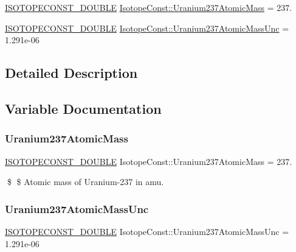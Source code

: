 \begin{DoxyCompactItemize}
\item 
\mbox{\hyperlink{group___isotope_const-_macros_ga8f45a7272ce02c0b4c65c44636ed719a}{I\+S\+O\+T\+O\+P\+E\+C\+O\+N\+S\+T\+\_\+\+D\+O\+U\+B\+LE}} \mbox{\hyperlink{group___isotope_const-_uranium-_u237_ga13242eded3eb260b79f6c0b5b1959673}{Isotope\+Const\+::\+Uranium237\+Atomic\+Mass}} = 237.
\item 
\mbox{\hyperlink{group___isotope_const-_macros_ga8f45a7272ce02c0b4c65c44636ed719a}{I\+S\+O\+T\+O\+P\+E\+C\+O\+N\+S\+T\+\_\+\+D\+O\+U\+B\+LE}} \mbox{\hyperlink{group___isotope_const-_uranium-_u237_ga8b2c53156a134b2a92ddc51b2fee14a2}{Isotope\+Const\+::\+Uranium237\+Atomic\+Mass\+Unc}} = 1.\+291e-\/06
\end{DoxyCompactItemize}


\subsection{Detailed Description}


\subsection{Variable Documentation}
\mbox{\label{group___isotope_const-_uranium-_u237_ga13242eded3eb260b79f6c0b5b1959673}} 
\subsubsection{\texorpdfstring{Uranium237\+Atomic\+Mass}{Uranium237AtomicMass}}
{\footnotesize\ttfamily \mbox{\hyperlink{group___isotope_const-_macros_ga8f45a7272ce02c0b4c65c44636ed719a}{I\+S\+O\+T\+O\+P\+E\+C\+O\+N\+S\+T\+\_\+\+D\+O\+U\+B\+LE}} Isotope\+Const\+::\+Uranium237\+Atomic\+Mass = 237.}

\$ \$ Atomic mass of Uranium-\/237 in amu. \mbox{\label{group___isotope_const-_uranium-_u237_ga8b2c53156a134b2a92ddc51b2fee14a2}} 
\subsubsection{\texorpdfstring{Uranium237\+Atomic\+Mass\+Unc}{Uranium237AtomicMassUnc}}
{\footnotesize\ttfamily \mbox{\hyperlink{group___isotope_const-_macros_ga8f45a7272ce02c0b4c65c44636ed719a}{I\+S\+O\+T\+O\+P\+E\+C\+O\+N\+S\+T\+\_\+\+D\+O\+U\+B\+LE}} Isotope\+Const\+::\+Uranium237\+Atomic\+Mass\+Unc = 1.\+291e-\/06}

